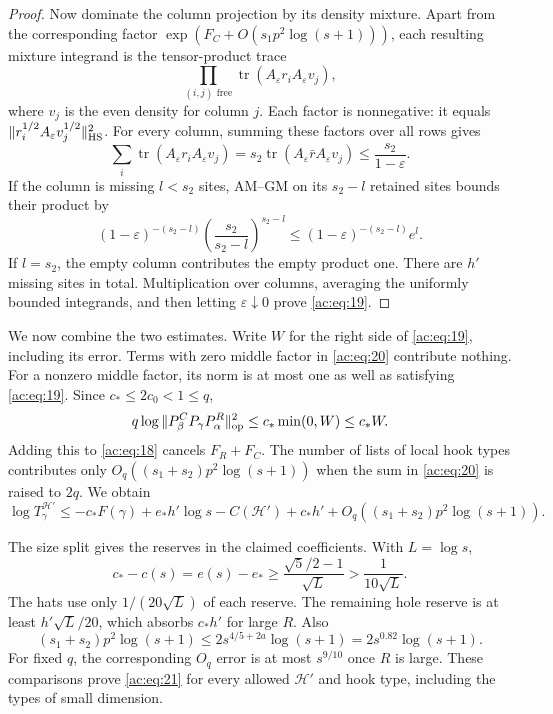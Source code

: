 \begin{proof}
Now dominate the column projection by its density mixture. Apart from
the corresponding factor
\(\exp(F_C+O(s_1p^2\log(s+1)))\), each resulting mixture integrand is
the tensor-product trace
\[
 \prod_{(i,j)\text{ free}}
 \operatorname{tr}(A_\varepsilon r_i A_\varepsilon v_j),
\]
where \(v_j\) is the even density for column \(j\). Each factor is
nonnegative: it equals
\(\|r_i^{1/2}A_\varepsilon v_j^{1/2}\|_{\rm HS}^2\).
For every column, summing these factors over all rows gives
\[
 \sum_i\operatorname{tr}(A_\varepsilon r_i A_\varepsilon v_j)
 =s_2\operatorname{tr}(A_\varepsilon\bar r A_\varepsilon v_j)
 \le\frac{s_2}{1-\varepsilon}.
\]
If the column is missing \(l<s_2\) sites, AM--GM on its \(s_2-l\)
retained sites bounds their product by
\[
 (1-\varepsilon)^{-(s_2-l)}
 \left(\frac{s_2}{s_2-l}\right)^{s_2-l}
 \le(1-\varepsilon)^{-(s_2-l)}e^l.
\]
If \(l=s_2\), the empty column contributes the empty product one.
There are \(h'\) missing sites in total. Multiplication over columns,
averaging the uniformly bounded integrands, and then letting
\(\varepsilon\downarrow0\) prove \eqref{ac:eq:19}.
\end{proof}

We now combine the two estimates. Write \(W\) for the right side of
\eqref{ac:eq:19}, including its error. Terms with zero middle factor in
\eqref{ac:eq:20} contribute nothing. For a nonzero middle factor, its norm
is at most one as well as satisfying \eqref{ac:eq:19}. Since
\(c_*\le2c_0<1\le q\),
\[
 q\log\|P_\beta^C P_\gamma P_\alpha^R\|_{\rm op}^2
 \le c_*\min(0,W)\le c_*W.
\]
Adding this to \eqref{ac:eq:18} cancels \(F_R+F_C\). The number of lists
of local hook types contributes only
\(O_q((s_1+s_2)p^2\log(s+1))\) when the sum in \eqref{ac:eq:20} is
raised to \(2q\). We obtain
\[
 \log T_\gamma^{\mathcal H'}
 \le-c_*F(\gamma)+e_*h'\log s-C(\mathcal H')
       +c_*h'+O_q((s_1+s_2)p^2\log(s+1)).
\]

The size split gives the reserves in the claimed coefficients. With
\(L=\log s\),
\[
 c_*-c(s)=e(s)-e_*
 \ge\frac{\sqrt5/2-1}{\sqrt L}
 >\frac1{10\sqrt L}.
\]
The hats use only \(1/(20\sqrt L)\) of each reserve. The remaining hole
reserve is at least \(h'\sqrt L/20\), which absorbs \(c_*h'\) for large
\(R\). Also
\[
 (s_1+s_2)p^2\log(s+1)
 \le2s^{4/5+2a}\log(s+1)=2s^{0.82}\log(s+1).
\]
For fixed \(q\), the corresponding \(O_q\) error is at most \(s^{9/10}\)
once \(R\) is large.
These comparisons prove \eqref{ac:eq:21} for every allowed
\(\mathcal H'\) and hook type, including the types of small dimension.

